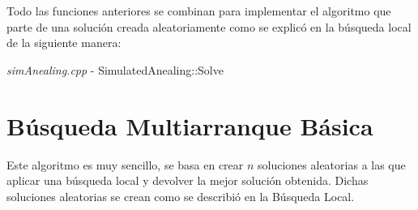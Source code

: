 \documentclass[a4paper, 12pt]{article}
\begin{document}
     	Todo las funciones anteriores se combinan para implementar el algoritmo que parte de una solución creada aleatoriamente como se explicó en la búsqueda local de la siguiente manera:\\
     	\begin{algorithm}[H]
       	\caption{\textit{simAnealing.cpp} - SimulatedAnealing::Solve}
       	
      \end{algorithm}
     	
     	
     	
     	
     	\newpage
     	\section{Búsqueda Multiarranque Básica}
     	Este algoritmo es muy sencillo, se basa en crear $n$ soluciones aleatorias a las que aplicar una búsqueda local y devolver la mejor solución obtenida. Dichas soluciones aleatorias se crean como se describió en la Búsqueda Local.\\
     	
\end{document}
